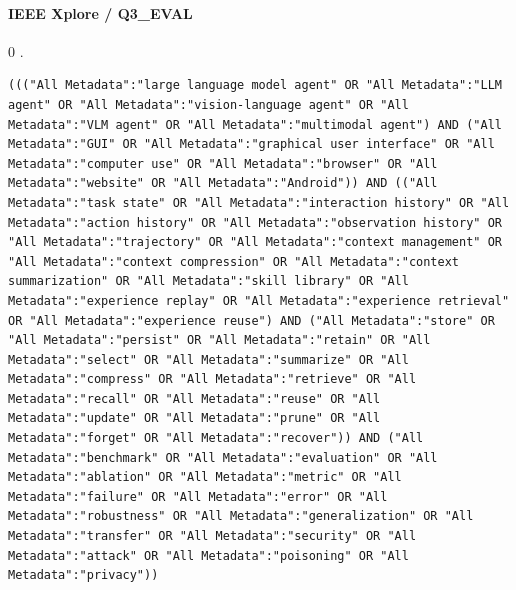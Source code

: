 \noindent\begin{minipage}{\linewidth}
\paragraph{IEEE Xplore / Q3\_EVAL}
0 .
\begin{lstlisting}
((("All Metadata":"large language model agent" OR "All Metadata":"LLM agent" OR "All Metadata":"vision-language agent" OR "All Metadata":"VLM agent" OR "All Metadata":"multimodal agent") AND ("All Metadata":"GUI" OR "All Metadata":"graphical user interface" OR "All Metadata":"computer use" OR "All Metadata":"browser" OR "All Metadata":"website" OR "All Metadata":"Android")) AND (("All Metadata":"task state" OR "All Metadata":"interaction history" OR "All Metadata":"action history" OR "All Metadata":"observation history" OR "All Metadata":"trajectory" OR "All Metadata":"context management" OR "All Metadata":"context compression" OR "All Metadata":"context summarization" OR "All Metadata":"skill library" OR "All Metadata":"experience replay" OR "All Metadata":"experience retrieval" OR "All Metadata":"experience reuse") AND ("All Metadata":"store" OR "All Metadata":"persist" OR "All Metadata":"retain" OR "All Metadata":"select" OR "All Metadata":"summarize" OR "All Metadata":"compress" OR "All Metadata":"retrieve" OR "All Metadata":"recall" OR "All Metadata":"reuse" OR "All Metadata":"update" OR "All Metadata":"prune" OR "All Metadata":"forget" OR "All Metadata":"recover")) AND ("All Metadata":"benchmark" OR "All Metadata":"evaluation" OR "All Metadata":"ablation" OR "All Metadata":"metric" OR "All Metadata":"failure" OR "All Metadata":"error" OR "All Metadata":"robustness" OR "All Metadata":"generalization" OR "All Metadata":"transfer" OR "All Metadata":"security" OR "All Metadata":"attack" OR "All Metadata":"poisoning" OR "All Metadata":"privacy"))
\end{lstlisting}
\end{minipage}\par\medskip
